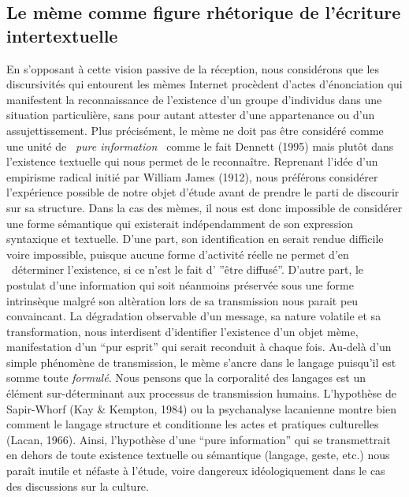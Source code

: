 \subsection[Le m\`eme comme figure rh\'etorique de l{\textquoteright}\'ecriture intertextuelle]{Le m\`eme comme figure rh\'etorique de l{\textquoteright}\'ecriture intertextuelle}
En s{\textquoteright}opposant \`a cette vision passive de la
r\'eception, nous consid\'erons que les discursivit\'es qui entourent
les m\`emes Internet proc\`edent d{\textquoteright}actes
d{\textquoteright}\'enonciation qui manifestent la reconnaissance de
l{\textquoteright}existence d{\textquoteright}un groupe
d{\textquoteright}individus dans une situation particuli\`ere, sans
pour autant attester d{\textquoteright}une appartenance ou
d{\textquoteright}un assujettissement. Plus pr\'ecis\'ement, le m\`eme
ne doit pas \^etre consid\'er\'e comme une unit\'e de
{\guillemotleft}~\textit{pure information~{\guillemotright}} comme le
fait Dennett (1995) mais plut\^ot dans l{\textquoteright}existence
textuelle qui nous permet de le reconna\^itre. Reprenant
l{\textquoteright}id\'ee d{\textquoteright}un empirisme radical
initi\'e par William James (1912), nous pr\'ef\'erons consid\'erer
l'exp\'erience possible de notre objet
d{\textquoteright}\'etude avant de prendre le parti de discourir sur sa
structure. Dans la cas des m\`emes, il nous est donc impossible de
consid\'erer une forme s\'emantique qui existerait ind\'ependamment de
son expression syntaxique et textuelle. D{\textquoteright}une part, son
identification en serait rendue difficile voire impossible, puisque
aucune forme d{\textquoteright}activit\'e r\'eelle ne permet
d{\textquoteright}en \ d\'eterminer l{\textquoteright}existence, si ce
n{\textquoteright}est le fait d{\textquoteright}
{\textquotedblright}\^etre diffus\'e{\textquotedblright}.
D{\textquoteright}autre part, le postulat d{\textquoteright}une
information qui soit n\'eanmoins pr\'eserv\'ee sous une forme
intrins\`eque malgr\'e son alt\`eration lors de sa transmission nous
parait peu convaincant. La d\'egradation observable
d{\textquoteright}un message, sa nature volatile et sa transformation,
nous interdisent d{\textquoteright}identifier
l{\textquoteright}existence d{\textquoteright}un objet m\`eme,
manifestation d{\textquoteright}un {\textquotedblleft}pur
esprit{\textquotedblright} qui serait reconduit \`a chaque fois.
Au-del\`a d{\textquoteright}un simple ph\'enom\`ene de transmission, le
m\`eme s{\textquoteright}ancre dans le langage
puisqu{\textquoteright}il est somme toute \textit{formul\'e}. Nous
pensons que la corporalit\'e des langages est un \'el\'ement
sur-d\'eterminant aux processus de transmission humains.
L{\textquoteright}hypoth\`ese de Sapir-Whorf (Kay \& Kempton, 1984) ou
la psychanalyse lacanienne montre bien comment le langage structure et
conditionne les actes et pratiques culturelles (Lacan, 1966). Ainsi,
l{\textquoteright}hypoth\`ese d{\textquoteright}une
{\textquotedblleft}pure information{\textquotedblright} qui se
transmettrait en dehors de toute existence textuelle ou s\'emantique
(langage, geste, etc.) nous para\^it inutile et n\'efaste \`a
l{\textquoteright}\'etude, voire dangereux id\'eologiquement dans le
cas des discussions sur la culture. 

